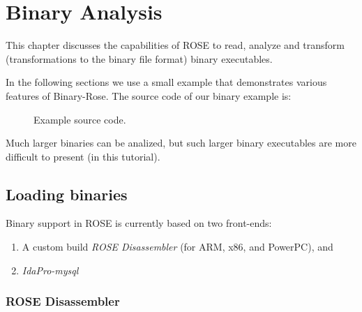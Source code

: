 \chapter{Binary Analysis}

This chapter discusses the capabilities of ROSE to read, analyze and transform 
(transformations to the binary file format) binary executables.

In the following sections we use a small example that demonstrates various 
features of Binary-Rose. The source code of our binary example is:

\begin{figure}[!h]
{\indent
{\mySmallFontSize

\begin{latexonly}
   
\end{latexonly}

\begin{htmlonly}
   
\end{htmlonly}

}
}
\caption{Example source code.}
\label{Tutorial:examplesourcecode}
\end{figure}

Much larger binaries can be analized, but such larger binary executables are more
difficult to present (in this tutorial).


\section{Loading binaries}

Binary support in ROSE is currently based on two front-ends: 
\begin{enumerate}
   \item A custom build \emph{ROSE Disassembler} (for ARM, x86, and PowerPC), and
   \item \emph{IdaPro-mysql}
\end{enumerate}


\subsection{ROSE Disassembler}

